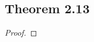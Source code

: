 \documentclass[../../main.tex]{subfiles}
\begin{document}
\subsection{Theorem 2.13}
\begin{wts}

\end{wts}
\begin{proof}

\end{proof}
\end{document}
